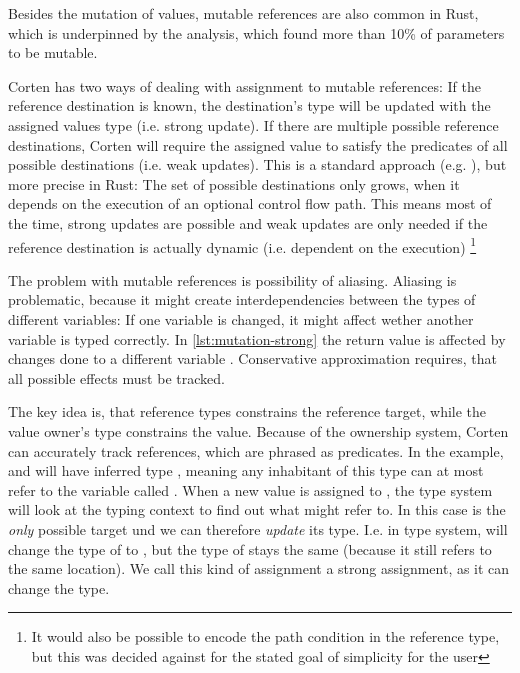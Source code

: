 \documentclass[twoside, english]{sdqthesis}
\theoremstyle{definition}
\begin{document}
Besides the mutation of values, mutable references are also common in Rust, which is underpinned by the analysis, which found more than 10\% of parameters to be mutable.

Corten has two ways of dealing with assignment to mutable references: If the reference destination is known, the destination's type will be updated with the assigned values type (i.e. strong update). If there are multiple possible reference destinations, Corten will require the assigned value to satisfy the predicates of all possible destinations (i.e. weak updates). This is a standard approach (e.g. \cite{kloos_asynchronous_2015}), but more precise in Rust: The set of possible destinations only grows, when it depends on the execution of an optional control flow path. This means most of the time, strong updates are possible and weak updates are only needed if the reference destination is actually dynamic (i.e. dependent on the execution) \footnote{It would also be possible to encode the path condition in the reference type, but this was decided against for the stated goal of simplicity for the user}

The problem with mutable references is possibility of aliasing. Aliasing is problematic, because it might create interdependencies between the types of different variables: If one variable is changed, it might affect wether another variable is typed correctly. In \cref{lst:mutation-strong} the return value  is affected by changes done to a different variable . Conservative approximation requires, that all possible effects must be tracked.

The key idea is, that reference types constrains the reference target, while the value owner's type constrains the value.
Because of the ownership system, Corten can accurately track references, which are phrased as predicates.
In the example,  and  will have inferred type , meaning any inhabitant of this type can at most refer to the variable called .
When a new value is assigned to , the type system will look at the typing context to find out what  might refer to. In this case  is the \textit{only} possible target und we can therefore \textit{update} its type. I.e. in type system,  will change the type of  to , but the type of  stays the same (because it still refers to the same location). We call this kind of assignment a strong assignment, as it can change the type. 
\end{document}
